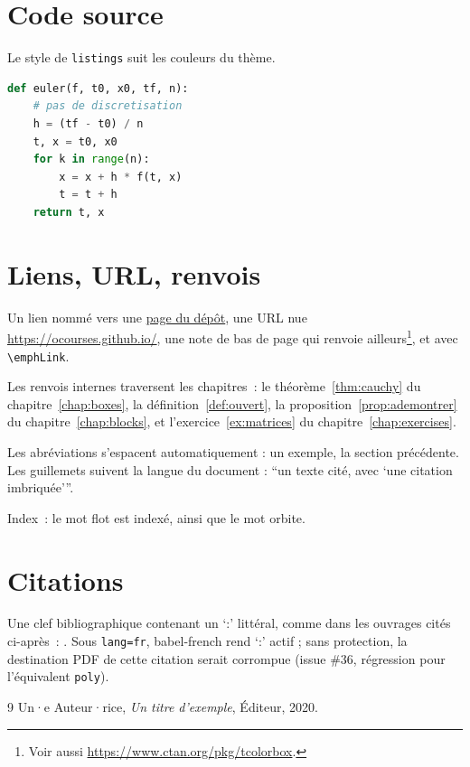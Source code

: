 \section{Code source}%
\label{sec:listings}

Le style de \texttt{listings} suit les couleurs du thème.

\begin{lstlisting}[language=Python, caption={Une méthode d'Euler explicite}]
def euler(f, t0, x0, tf, n):
    # pas de discretisation
    h = (tf - t0) / n
    t, x = t0, x0
    for k in range(n):
        x = x + h * f(t, x)
        t = t + h
    return t, x
\end{lstlisting}

\section{Liens, URL, renvois}%
\label{sec:links}

Un lien nommé vers une
\href{https://github.com/ocourses/ocots-latex-template}{page du dépôt}, une URL
nue \url{https://ocourses.github.io/}, une note de bas de page qui renvoie
ailleurs\footnote{Voir aussi \url{https://www.ctan.org/pkg/tcolorbox}.}, et
 avec \verb|\emphLink|.

Les renvois internes traversent les chapitres~: le théorème~\ref{thm:cauchy} du
chapitre~\ref{chap:boxes}, la définition~\ref{def:ouvert}, la
proposition~\ref{prop:ademontrer} du chapitre~\ref{chap:blocks}, et
l'exercice~\ref{ex:matrices} du chapitre~\ref{chap:exercises}.

Les abréviations s'espacent automatiquement : \ie un exemple, \cf la section
précédente. Les guillemets suivent la langue du document : \enquote{un texte
cité, avec \enquote{une citation imbriquée}}.

Index~: le mot flot est indexé, ainsi que le
mot orbite.

\section{Citations}%
\label{sec:citations}

Une clef bibliographique contenant un `:' littéral, comme dans les ouvrages
cités ci-après~: \cite{Exemple:2020}. Sous \texttt{lang=fr}, babel-french
rend `:' actif ; sans protection, la destination PDF de cette citation serait
corrompue (issue \#36, régression pour l'équivalent \texttt{poly}).

\begin{thebibliography}{9}
\noindent Un·e Auteur·rice, \emph{Un titre d'exemple}, Éditeur, 2020.

\end{thebibliography}
